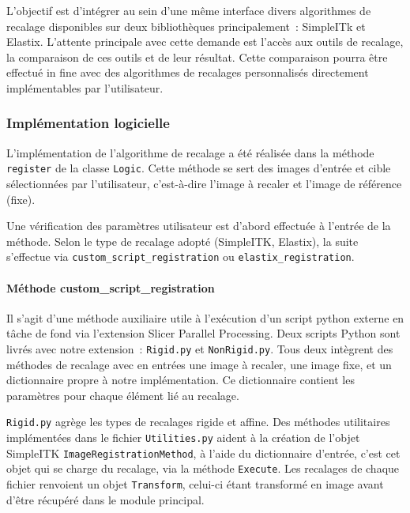\documentclass{article}
\newcommand{\subsubsubsection}[1]{\paragraph{#1}\par\noindent\bigskip}
\begin{document}
{{        \bigskip

        L'objectif est d'intégrer au sein d'une même interface divers algorithmes de recalage disponibles sur deux bibliothèques principalement~: SimpleITk et Elastix. L'attente principale avec cette demande est l'accès aux outils de recalage, la comparaison de ces outils et de leur résultat. Cette comparaison pourra être effectué in fine avec des algorithmes de recalages personnalisés directement implémentables par l'utilisateur.

        \subsubsection{Implémentation logicielle}
        \label{subsubsec:softwaréregistration-implementation}

        L'implémentation de l'algorithme de recalage a été réalisée dans la méthode \texttt{register} de la classe \texttt{Logic}. Cette méthode se sert des images d'entrée et cible sélectionnées par l'utilisateur, c'est-à-dire l'image à recaler et l'image de référence (fixe).

        Une vérification des paramètres utilisateur est d'abord effectuée à l'entrée de la méthode. Selon le type de recalage adopté (SimpleITK, Elastix), la suite s'effectue via \texttt{custom\_script\_registration} ou \texttt{elastix\_registration}.

        \bigskip
        \subsubsubsection{Méthode custom\_script\_registration}

        Il s'agit d'une méthode auxiliaire utile à l'exécution d'un script python externe en tâche de fond via l'extension Slicer Parallel Processing. Deux scripts Python sont livrés avec notre extension~: \texttt{Rigid.py} et \texttt{NonRigid.py}. Tous deux intègrent des méthodes de recalage avec en entrées une image à recaler, une image fixe, et un dictionnaire propre à notre implémentation. Ce dictionnaire contient les paramètres pour chaque élément lié au recalage.

        \texttt{Rigid.py} agrège les types de recalages rigide et affine. Des méthodes utilitaires implémentées dans le fichier \texttt{Utilities.py} aident à la création de l'objet SimpleITK \texttt{ImageRegistrationMethod}, à l'aide du dictionnaire d'entrée, c'est cet objet qui se charge du recalage, via la méthode \texttt{Execute}. Les recalages de chaque fichier renvoient un objet \texttt{Transform}, celui-ci étant transformé en image avant d'être récupéré dans le module principal.

}}
\end{document}
